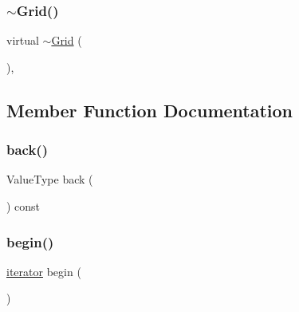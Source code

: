 \mbox{\label{classGrid_a422a4b493ffd647fcf87ff31619127ba}} 
\subsubsection{\texorpdfstring{$\sim$\+Grid()}{~Grid()}}
{\footnotesize\ttfamily virtual $\sim$\mbox{\hyperlink{classGrid}{Grid}} (\begin{DoxyParamCaption}{ }\end{DoxyParamCaption})\hspace{0.3cm}{\ttfamily [virtual]}, {\ttfamily [default]}}



\subsection{Member Function Documentation}
\mbox{\label{classGrid_a38cbd80c93f450dc9bf3ca7c6a6220bd}} 
\subsubsection{\texorpdfstring{back()}{back()}}
{\footnotesize\ttfamily Value\+Type back (\begin{DoxyParamCaption}{ }\end{DoxyParamCaption}) const}

\mbox{\label{classGrid_ad69bd11391be1a1dba5c8202259664f8}} 
\subsubsection{\texorpdfstring{begin()}{begin()}\hspace{0.1cm}{\footnotesize\ttfamily [1/2]}}
{\footnotesize\ttfamily \mbox{\hyperlink{classGrid_afc815b8f7acde11a959911c7f7222116}{iterator}} begin (\begin{DoxyParamCaption}{ }\end{DoxyParamCaption})\hspace{0.3cm}{\ttfamily [inline]}}

\mbox{\label{classGrid_a29305669b60ca1680752e2fc3592ba99}} 
